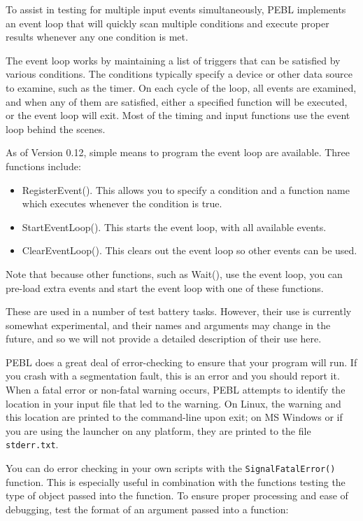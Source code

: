 
To assist in testing for multiple input events simultaneously, 
PEBL implements an event loop that will quickly scan multiple conditions
and execute proper results whenever any one condition is met.  

The event loop works by maintaining a list of triggers that can be satisfied by various conditions. The conditions typically specify a device or other data source to examine, such as the timer.  On each cycle of the loop, all events are examined, and when any of them are satisfied, either a specified function will be executed, or the event loop will exit.  Most of the timing and input functions use the event loop behind the scenes.

As of Version  0.12, simple means to program the event loop are available.  Three functions include:
\begin{itemize}
\item RegisterEvent().  This allows you to specify a condition and a function name which executes whenever the condition is true.      
\item StartEventLoop().  This starts the event loop, with all available events.     
\item ClearEventLoop().  This clears out the event loop so other events can be used.     
\end{itemize}
Note that because other functions, such as Wait(), use the event loop, you can pre-load extra events and start the event loop with one of these functions.

These are used in a number of test battery tasks.  However, their use is currently somewhat experimental, and their names and arguments may change in the future, and so we will not provide a detailed description of their use here.



PEBL does a great deal of error-checking to ensure that your program
will run.  If you crash with a segmentation fault, this is an error
and you should report it.  When a fatal error or non-fatal warning
occurs, PEBL attempts to identify the location in your input file that
led to the warning.  On Linux, the warning and this location are
printed to the command-line upon exit; on MS Windows or if you are using the launcher on any platform, they are printed
to the file \texttt{stderr.txt}.

You can do error checking  in your own scripts with the
\texttt{SignalFatalError()} function.  This is especially useful in
combination with the functions testing the type of object passed into 
the function.  To ensure proper processing and ease of debugging, test
the format of an argument passed into a function:

